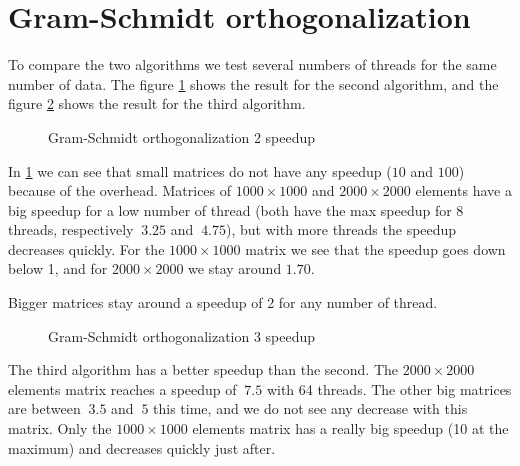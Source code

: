 \section{Gram-Schmidt orthogonalization}

To compare the two algorithms we test several numbers of threads for the same number of data. The figure \ref{fig:gram2} shows the result for the second algorithm, and the figure \ref{fig:gram3} shows the result for the third algorithm.\\

\begin{figure}[!h]
  \begin{center}
  \end{center}
  \caption{Gram-Schmidt orthogonalization 2 speedup}
  \label{fig:gram2}
\end{figure}

In \ref{fig:gram2} we can see that small matrices do not have any speedup ($10$ and $100$) because of the overhead.
Matrices of $1000\times 1000$ and  $2000\times 2000$ elements have a big speedup for a low number of thread (both have the max speedup for 8 threads, respectively $~3.25$ and $~4.75$), but with more threads the speedup decreases quickly. For the $1000\times 1000$ matrix we see that the speedup goes down below 1, and for $2000\times 2000$ we stay around $1.70$.

Bigger matrices stay around a speedup of 2 for any number of thread.\\

\begin{figure}[!h]
  \begin{center}
  \end{center}
  \caption{Gram-Schmidt orthogonalization 3 speedup}
  \label{fig:gram3}
\end{figure}

The third algorithm has a better speedup than the second. The $2000\times 2000$ elements matrix reaches a speedup of $~7.5$ with 64 threads. The other big matrices are between $~3.5$ and $~5$ this time, and we do not see any decrease with this matrix. Only the $1000\times 1000$ elements matrix has a really big speedup (10 at the maximum) and decreases quickly just after.
